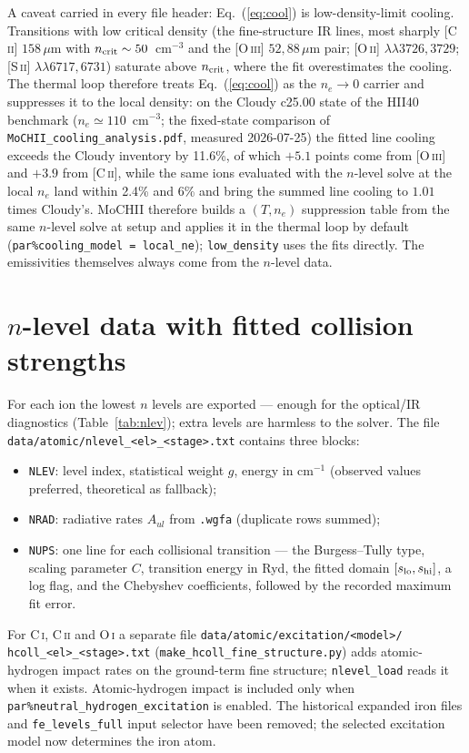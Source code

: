 \documentclass[english,a4paper]{my_memo}
\newcommand{\code}[1]{\texttt{#1}}
\begin{document}
A caveat carried in every file header: Eq.~(\ref{eq:cool}) is
low-density-limit cooling.  Transitions with low critical density (the
fine-structure IR lines, most sharply [C\,\textsc{ii}] $158\,\mu$m with
$n_{\rm crit} \sim 50$~cm$^{-3}$ and the [O\,\textsc{iii}]
$52,88\,\mu$m pair; [O\,\textsc{ii}] $\lambda\lambda 3726,3729$;
[S\,\textsc{ii}] $\lambda\lambda 6717,6731$) saturate above
$n_{\rm crit}$, where the fit overestimates the cooling.  The thermal
loop therefore treats Eq.~(\ref{eq:cool}) as the $n_e \to 0$ carrier and
suppresses it to the local density: on the Cloudy c25.00 state of the
HII40 benchmark ($n_e \simeq 110$~cm$^{-3}$; the fixed-state comparison of
\code{MoCHII\_cooling\_analysis.pdf}, measured 2026-07-25) the fitted line cooling
exceeds the Cloudy inventory by 11.6\%, of which $+5.1$ points come from
[O\,\textsc{iii}] and $+3.9$ from [C\,\textsc{ii}], while the same ions
evaluated with the $n$-level solve at the local $n_e$ land within 2.4\%
and 6\% and bring the summed line cooling to $1.01$ times Cloudy's.
MoCHII therefore builds a $(T, n_e)$ suppression table from the same
$n$-level solve at setup and applies it in the thermal loop by default
(\code{par\%cooling\_model = local\_ne}); \code{low\_density} uses the
fits directly.  The emissivities themselves always come from the
$n$-level data.

\section{$n$-level data with fitted collision strengths}
\label{sec:nlevel}
For each ion the lowest $n$ levels are exported --- enough for the
optical/IR diagnostics (Table~\ref{tab:nlev}); extra levels are harmless
to the solver.  The file \code{data/atomic/nlevel\_<el>\_<stage>.txt} contains
three blocks:
\begin{itemize}
\item \code{NLEV}: level index, statistical weight $g$, energy in
  cm$^{-1}$ (observed values preferred, theoretical as fallback);
\item \code{NRAD}: radiative rates $A_{ul}$ from \code{.wgfa} (duplicate
  rows summed);
\item \code{NUPS}: one line for each collisional transition --- the
  Burgess--Tully type, scaling parameter $C$, transition energy in Ryd,
  the fitted domain $[s_{\rm lo}, s_{\rm hi}]$, a log flag, and the
  Chebyshev coefficients, followed by the recorded maximum fit error.
\end{itemize}
For C\,\textsc{i}, C\,\textsc{ii} and O\,\textsc{i} a separate file
\code{data/atomic/excitation/<model>/}\\\code{hcoll\_<el>\_<stage>.txt}
(\code{make\_hcoll\_fine\_structure.py}) adds atomic-hydrogen impact rates
on the ground-term fine structure; \code{nlevel\_load} reads it when it
exists.  Atomic-hydrogen impact is included only when
\code{par\%neutral\_hydrogen\_excitation} is enabled.  The historical
expanded iron files and \code{fe\_levels\_full} input selector have been
removed; the selected excitation model now determines the iron atom.
\end{document}
